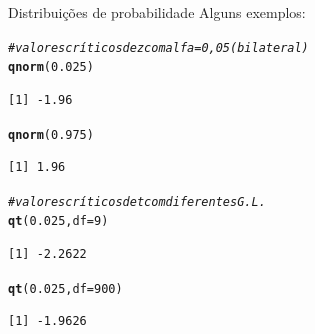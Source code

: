 \documentclass[10pt]{beamer}\usepackage[]{graphicx}\usepackage[]{color}
\makeatletter
\newcommand{\hlnum}[1]{\textcolor[rgb]{0.686,0.059,0.569}{#1}}%
\newcommand{\hlcom}[1]{\textcolor[rgb]{0.678,0.584,0.686}{\textit{#1}}}%
\newcommand{\hlstd}[1]{\textcolor[rgb]{0.345,0.345,0.345}{#1}}%
\newcommand{\hlkwc}[1]{\textcolor[rgb]{0.333,0.667,0.333}{#1}}%
\newcommand{\hlkwd}[1]{\textcolor[rgb]{0.737,0.353,0.396}{\textbf{#1}}}%
\newenvironment{kframe}{%
 \def\at@end@of@kframe{}%
 \ifinner\ifhmode%
  \def\at@end@of@kframe{\end{minipage}}%
  \begin{minipage}{\columnwidth}%
 \fi\fi%
 \def\FrameCommand##1{\hskip\@totalleftmargin \hskip-\fboxsep
 \colorbox{shadecolor}{##1}\hskip-\fboxsep
     \hskip-\linewidth \hskip-\@totalleftmargin \hskip\columnwidth}%
 \MakeFramed {\advance\hsize-\width
   \@totalleftmargin\z@ \linewidth\hsize
   \@setminipage}}%
 {\par\unskip\endMakeFramed%
 \at@end@of@kframe}
\newenvironment{knitrout}{}{} %
\theoremstyle{definition}
\makeatother
\begin{document}
\begin{frame}[fragile=singleslide]{Distribuições de probabilidade}
Alguns exemplos:
\begin{knitrout}\small
{}\color{fgcolor}\begin{kframe}
\begin{alltt}
\hlcom{# valores críticos de z com alfa = 0,05 (bilateral)}
\hlkwd{qnorm}\hlstd{(}\hlnum{0.025}\hlstd{)}
\end{alltt}
\begin{verbatim}
[1] -1.96
\end{verbatim}
\begin{alltt}
\hlkwd{qnorm}\hlstd{(}\hlnum{0.975}\hlstd{)}
\end{alltt}
\begin{verbatim}
[1] 1.96
\end{verbatim}
\begin{alltt}
\hlcom{# valores críticos de t com diferentes G.L.}
\hlkwd{qt}\hlstd{(}\hlnum{0.025}\hlstd{,} \hlkwc{df} \hlstd{=} \hlnum{9}\hlstd{)}
\end{alltt}
\begin{verbatim}
[1] -2.2622
\end{verbatim}
\begin{alltt}
\hlkwd{qt}\hlstd{(}\hlnum{0.025}\hlstd{,}\hlkwc{df} \hlstd{=} \hlnum{900}\hlstd{)}
\end{alltt}
\begin{verbatim}
[1] -1.9626
\end{verbatim}
\end{kframe}
\end{knitrout}
\end{frame}
\end{document}
